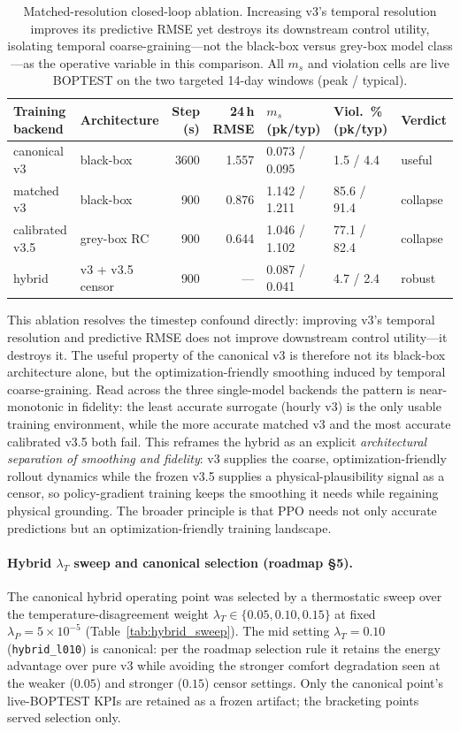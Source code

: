 \documentclass[11pt,a4paper]{article}
\begin{document}
\begin{table}[H]
\centering
\caption{Matched-resolution closed-loop ablation. Increasing v3's temporal resolution improves its predictive RMSE yet destroys its downstream control utility, isolating temporal coarse-graining---not the black-box versus grey-box model class---as the operative variable in this comparison. All $m_s$ and violation cells are live BOPTEST on the two targeted 14-day windows (peak / typical).}
\label{tab:coarse_graining}
\small
\begin{tabular}{llrrlll}
\toprule
Training backend & Architecture & Step (s) & 24\,h RMSE & $m_s$ (pk/typ) & Viol.\ \% (pk/typ) & Verdict \\
\midrule
canonical v3 & black-box & 3600 & 1.557 & 0.073 / 0.095 & 1.5 / 4.4 & useful \\
matched v3 & black-box & 900 & 0.876 & 1.142 / 1.211 & 85.6 / 91.4 & collapse \\
calibrated v3.5 & grey-box RC & 900 & 0.644 & 1.046 / 1.102 & 77.1 / 82.4 & collapse \\
hybrid & v3 + v3.5 censor & 900 & --- & 0.087 / 0.041 & 4.7 / 2.4 & robust \\
\bottomrule
\end{tabular}
\end{table}

This ablation resolves the timestep confound directly: improving v3's temporal resolution and predictive RMSE does not improve downstream control utility---it destroys it. The useful property of the canonical v3 is therefore not its black-box architecture alone, but the optimization-friendly smoothing induced by temporal coarse-graining. Read across the three single-model backends the pattern is near-monotonic in fidelity: the least accurate surrogate (hourly v3) is the only usable training environment, while the more accurate matched v3 and the most accurate calibrated v3.5 both fail. This reframes the hybrid as an explicit \emph{architectural separation of smoothing and fidelity}: v3 supplies the coarse, optimization-friendly rollout dynamics while the frozen v3.5 supplies a physical-plausibility signal as a censor, so policy-gradient training keeps the smoothing it needs while regaining physical grounding. The broader principle is that PPO needs not only accurate predictions but an optimization-friendly training landscape.

\paragraph{Hybrid $\lambda_T$ sweep and canonical selection (roadmap \S5).} The canonical hybrid operating point was selected by a thermostatic sweep over the temperature-disagreement weight $\lambda_T\in\{0.05,0.10,0.15\}$ at fixed $\lambda_P=5\times10^{-5}$ (Table~\ref{tab:hybrid_sweep}). The mid setting $\lambda_T=0.10$ (\texttt{hybrid\_l010}) is canonical: per the roadmap selection rule it retains the energy advantage over pure v3 while avoiding the stronger comfort degradation seen at the weaker ($0.05$) and stronger ($0.15$) censor settings. Only the canonical point's live-BOPTEST KPIs are retained as a frozen artifact; the bracketing points served selection only.
\end{document}
